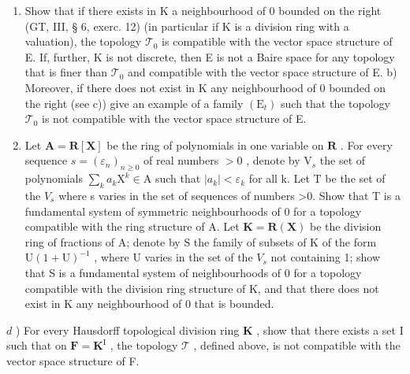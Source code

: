 \begin{enumerate}
\def\labelenumi{\alph{enumi})}
\item
  Show that if there exists in K a neighbourhood of 0 bounded on the right (GT, III, § 6, exerc. 12) (in particular if K is a division ring with a valuation), the topology \(\mathcal{T}_0\) is compatible with the vector space structure of E. If, further, K is not discrete, then E is not a Baire space for any topology that is finer than \(\mathcal{T}_0\) and compatible with the vector space structure of E. b) Moreover, if there does not exist in K any neighbourhood of 0 bounded on the right (see c)) give an example of a family \((\mathrm{E}_t)\) such that the topology \(\mathcal{T}_0\) is not compatible with the vector space structure of E.
\item
  Let \(\mathbf{A} = \mathbf{R}[\mathbf{X}]\) be the ring of polynomials in one variable on \(\mathbf{R}\) . For every sequence \(s = (\varepsilon_n)_{n\geqslant 0}\) of real numbers \(>0\) , denote by \(\mathrm{V}_s\) the set of polynomials \(\sum_k a_k\mathrm{X}^k\in \mathrm{A}\) such that \(|a_k| < \varepsilon_k\) for all k. Let T be the set of the \(V_{s}\) where s varies in the set of sequences of numbers \textgreater0. Show that T is a fundamental system of symmetric neighbourhoods of 0 for a topology compatible with the ring structure of A. Let \(\mathbf{K} = \mathbf{R}(\mathbf{X})\) be the division ring of fractions of A; denote by S the family of subsets of K of the form \(\mathrm{U}(1 + \mathrm{U})^{-1}\) , where U varies in the set of the \(V_{s}\) not containing 1; show that S is a fundamental system of neighbourhoods of 0 for a topology compatible with the division ring structure of K, and that there does not exist in K any neighbourhood of 0 that is bounded.
\end{enumerate}

\(d\) ) For every Hausdorff topological division ring \(\mathbf{K}\) , show that there exists a set I such that on \(\mathbf{F} = \mathbf{K}^{\mathrm{I}}\) , the topology \(\mathcal{T}\) , defined above, is not compatible with the vector space structure of F.
\relax{}
